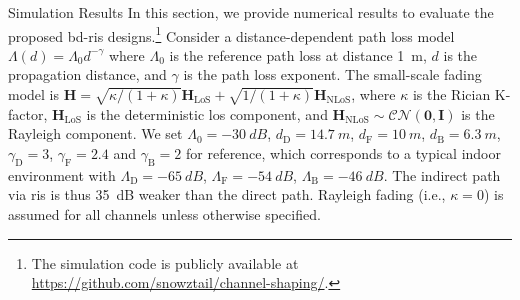 \documentclass[journal]{IEEEtran}
\begin{document}
\begin{section}{Simulation Results}\label{sc:simulation}
	In this section, we provide numerical results to evaluate the proposed \gls{bd}-\gls{ris} designs.\footnote{The simulation code is publicly available at \url{https://github.com/snowztail/channel-shaping/}.}
	Consider a distance-dependent path loss model $\Lambda(d) = \Lambda_0 d^{-\gamma}$ where $\Lambda_0$ is the reference path loss at distance \qty{1}{m}, $d$ is the propagation distance, and $\gamma$ is the path loss exponent.
	The small-scale fading model is $\mathbf{H} = \sqrt{\kappa/(1+\kappa)} \mathbf{H}_\text{LoS} + \sqrt{1/(1+\kappa)} \mathbf{H}_\text{NLoS}$, where $\kappa$ is the Rician K-factor, $\mathbf{H}_\text{LoS}$ is the deterministic \gls{los} component, and $\mathbf{H}_\text{NLoS} \sim \mathcal{CN}(\mathbf{0}, \mathbf{I})$ is the Rayleigh component.
	We set $\Lambda_0=\qty{-30}{dB}$, $d_\mathrm{D}=\qty{14.7}{m}$, $d_\mathrm{F}=\qty{10}{m}$, $d_\mathrm{B}=\qty{6.3}{m}$, $\gamma_\mathrm{D}=3$, $\gamma_\mathrm{F}=2.4$ and $\gamma_\mathrm{B}=2$ for reference, which corresponds to a typical indoor environment with $\Lambda_\mathrm{D}=\qty{-65}{dB}$, $\Lambda_\mathrm{F}=\qty{-54}{dB}$, $\Lambda_\mathrm{B}=\qty{-46}{dB}$.
	The indirect path via \gls{ris} is thus \qty{35}{\dB} weaker than the direct path.
	Rayleigh fading (i.e., $\kappa = 0$) is assumed for all channels unless otherwise specified.


\end{section}
\end{document}
